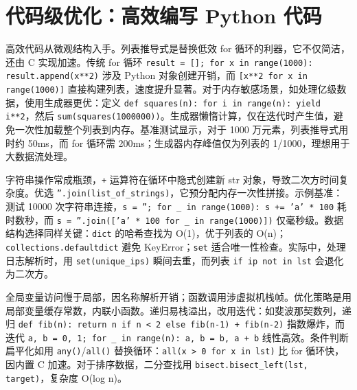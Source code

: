 \chapter{代码级优化：高效编写 Python 代码}
高效代码从微观结构入手。列表推导式是替换低效 for 循环的利器，它不仅简洁，还由 C 实现加速。传统 for 循环 \texttt{result = []; for x in range(1000): result.append(x**2)} 涉及 Python 对象创建开销，而 \texttt{[x**2 for x in range(1000)]} 直接构建列表，速度提升显著。对于内存敏感场景，如处理亿级数据，使用生成器更优：定义 \texttt{def squares(n): for i in range(n): yield i**2}，然后 \texttt{sum(squares(1000000))}。生成器懒惰计算，仅在迭代时产生值，避免一次性加载整个列表到内存。基准测试显示，对于 1000 万元素，列表推导式用时约 50ms，而 for 循环需 200ms；生成器内存峰值仅为列表的 1/1000，理想用于大数据流处理。\par
字符串操作常成瓶颈，\texttt{+} 运算符在循环中隐式创建新 str 对象，导致二次方时间复杂度。优选 \texttt{''.join(list\_{}of\_{}strings)}，它预分配内存一次性拼接。示例基准：测试 10000 次字符串连接，\texttt{s = ''; for \_{} in range(1000): s += 'a' * 100} 耗时数秒，而 \texttt{s = ''.join(['a' * 100 for \_{} in range(1000)])} 仅毫秒级。数据结构选择同样关键：\texttt{dict} 的哈希查找为 O(1)，优于列表的 O(n)；\texttt{collections.defaultdict} 避免 KeyError；\texttt{set} 适合唯一性检查。实际中，处理日志解析时，用 \texttt{set(unique\_{}ips)} 瞬间去重，而列表 \texttt{if ip not in lst} 会退化为二次方。\par
全局变量访问慢于局部，因名称解析开销；函数调用涉虚拟机栈帧。优化策略是用局部变量缓存常数，内联小函数。递归易栈溢出，改用迭代：如斐波那契数列，递归 \texttt{def fib(n): return n if n < 2 else fib(n-1) + fib(n-2)} 指数爆炸，而迭代 \texttt{a, b = 0, 1; for \_{} in range(n): a, b = b, a + b} 线性高效。条件判断扁平化如用 \texttt{any()}/\texttt{all()} 替换循环：\texttt{all(x > 0 for x in lst)} 比 for 循环快，因内置 C 加速。对于排序数据，二分查找用 \texttt{bisect.bisect\_{}left(lst, target)}，复杂度 O(log n)。\par
